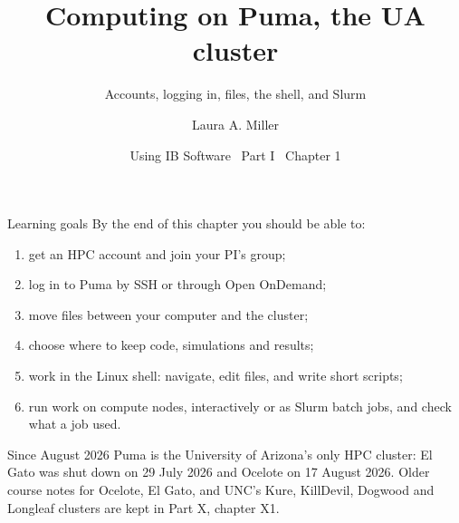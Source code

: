 \documentclass[aspectratio=169,11pt]{beamer}
\title[Computing environment]{Computing on Puma, the UA cluster}
\subtitle{Accounts, logging in, files, the shell, and Slurm}
\author[Miller]{Laura A. Miller}
\institute[UArizona]{Department of Mathematics, University of Arizona}
\date{Using IB Software \textbullet\ Part I \textbullet\ Chapter 1}
\begin{document}
\begin{frame}[plain]
\end{frame}

\begin{frame}{Learning goals}
By the end of this chapter you should be able to:
\begin{enumerate}
  \item get an HPC account and join your PI's group;
  \item log in to Puma by SSH or through Open OnDemand;
  \item move files between your computer and the cluster;
  \item choose where to keep code, simulations and results;
  \item work in the Linux shell: navigate, edit files, and write short scripts;
  \item run work on compute nodes, interactively or as Slurm batch jobs, and check what a job used.
\end{enumerate}
\vspace{3mm}
\begin{punchbox}
\small Since August 2026 Puma is the University of Arizona's only HPC cluster: El Gato was shut down on 29 July 2026 and Ocelote on 17 August 2026. Older course notes for Ocelote, El Gato, and UNC's Kure, KillDevil, Dogwood and Longleaf clusters are kept in Part X, chapter X1.
\end{punchbox}
\end{frame}
\end{document}
